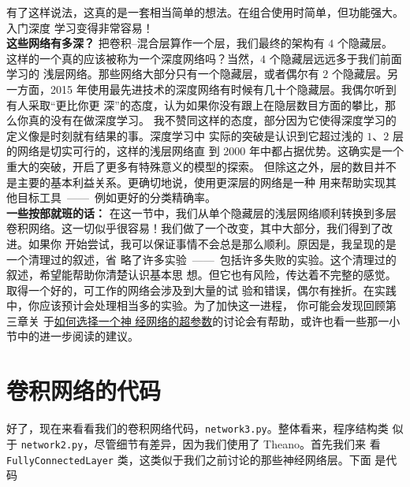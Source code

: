 有了这样说法，这真的是一套相当简单的想法。在组合使用时简单，但功能强大。入门深度
学习变得非常容易！\\

\textbf{这些网络有多深？} 把卷积--混合层算作一个层，我们最终的架构有 $4$ 个隐藏层。
这样的一个真的应该被称为一个深度网络吗？当然，$4$ 个隐藏层远远多于我们前面学习的
浅层网络。那些网络大部分只有一个隐藏层，或者偶尔有 $2$ 个隐藏层。另一方面，2015
年使用最先进技术的深度网络有时候有几十个隐藏层。我偶尔听到有人采取“更比你更
深”的态度，认为如果你没有跟上在隐层数目方面的攀比，那么你真的没有在做深度学习。
我不赞同这样的态度，部分因为它使得深度学习的定义像是时刻就有结果的事。深度学习中
实际的突破是认识到它超过浅的 $1$、$2$ 层的网络是切实可行的，这样的浅层网络直
到 2000 年中都占据优势。这确实是一个重大的突破，开启了更多有特殊意义的模型的探索。
但除这之外，层的数目并不是主要的基本利益关系。更确切地说，使用更深层的网络是一种
用来帮助实现其他目标工具~——~例如更好的分类精确率。
\\

\textbf{一些按部就班的话：} 在这一节中，我们从单个隐藏层的浅层网络顺利转换到多层
卷积网络。这一切似乎很容易！我们做了一个改变，其中大部分，我们得到了改进。如果你
开始尝试，我可以保证事情不会总是那么顺利。原因是，我呈现的是一个清理过的叙述，省
略了许多实验~——~包括许多失败的实验。这个清理过的叙述，希望能帮助你清楚认识基本思
想。但它也有风险，传达着不完整的感觉。取得一个好的，可工作的网络会涉及到大量的试
验和错误，偶尔有挫折。在实践中，你应该预计会处理相当多的实验。为了加快这一进程，
你可能会发现回顾第三章关
于\hyperref[sec:how_to_choose_a_neural_network's_hyper-parameters]{如何选择一个神
  经网络的超参数}的讨论会有帮助，或许也看一些那一小节中的进一步阅读的建议。

\section{卷积网络的代码}
\label{sec:the_code_for_our_convolutional_networks}

好了，现在来看看我们的卷积网络代码，\lstinline!network3.py!。整体看来，程序结构类
似于 \lstinline!network2.py!，尽管细节有差异，因为我们使用了 Theano。首先我们来
看 \lstinline!FullyConnectedLayer! 类，这类似于我们之前讨论的那些神经网络层。下面
是代码

